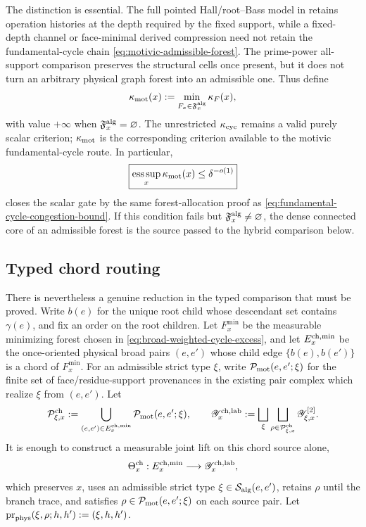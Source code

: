 \documentclass[11pt]{article}
\begin{document}
The distinction is essential.  The full pointed Hall/root--Bass model in
\cite{UnifiedTower} retains operation histories at the depth required by the
fixed support, while a fixed-depth channel or face-minimal derived
compression need not retain the fundamental-cycle chain
\eqref{eq:motivic-admissible-forest}.  The prime-power all-support comparison
preserves the structural cells once present, but it does not turn an arbitrary
physical graph forest into an admissible one.  Thus define
\[
 \kappa_{\rm mot}(x):=
 \min_{F_x\in\mathfrak F_x^{\rm alg}}\kappa_F(x),
\]
with value \(+\infty\) when \(\mathfrak F_x^{\rm alg}=\varnothing\).
The unrestricted \(\kappa_{\rm cyc}\) remains a valid purely scalar
criterion; \(\kappa_{\rm mot}\) is the corresponding criterion available to
the motivic fundamental-cycle route.  In particular,
\begin{equation}\label{eq:motivic-cycle-congestion-bound}
 \boxed{
 \operatorname*{ess\,sup}_x\kappa_{\rm mot}(x)
 \le\delta^{-o(1)}}
\end{equation}
closes the scalar gate by the same forest-allocation proof as
\eqref{eq:fundamental-cycle-congestion-bound}.  If this condition fails but
\(\mathfrak F_x^{\rm alg}\ne\varnothing\), the dense connected core of an
admissible forest is the source passed to the hybrid comparison below.

\subsection{Typed chord routing}

There is nevertheless a genuine reduction in the typed comparison that must
be proved.  Write \(b(e)\) for the unique root child whose descendant set
contains \(\gamma(e)\), and fix an order on the root children.  Let
\(F_x^{\min}\) be the measurable minimizing forest chosen in
\eqref{eq:broad-weighted-cycle-excess}, and let \(E_x^{\rm ch,min}\) be the
once-oriented physical broad pairs \((e,e')\) whose child edge
\(\{b(e),b(e')\}\) is a chord of \(F_x^{\min}\).  For an admissible strict
type \(\xi\), write \(\mathcal P_{\rm mot}(e,e';\xi)\) for the finite set of
face/residue-support provenances in the existing pair complex which realize
\(\xi\) from \((e,e')\).  Let
\[
 \mathcal P_{\xi,x}^{\rm ch}
 :=\bigcup_{(e,e')\in E_x^{\rm ch,min}}
      \mathcal P_{\rm mot}(e,e';\xi),
 \qquad
 \mathscr Y_x^{\rm ch,lab}
 :=\bigsqcup_\xi\bigsqcup_{\rho\in\mathcal P_{\xi,x}^{\rm ch}}
      \mathscr Y_{\xi,x}^{[2]}.
\]
It is enough to construct a measurable joint lift on this chord source alone,
\[
 \Theta_x^{\rm ch}:E_x^{\rm ch,min}\longrightarrow
 \mathscr Y_x^{\rm ch,lab},
\]
which preserves \(x\), uses an admissible strict type
\(\xi\in\mathcal S_{\rm alg}(e,e')\), retains \(\rho\) until the branch trace,
and satisfies \(\rho\in\mathcal P_{\rm mot}(e,e';\xi)\) on each source pair.
Let
\(\operatorname{pr}_{\rm phys}(\xi,\rho;h,h'):=(\xi,h,h')\).
\end{document}
